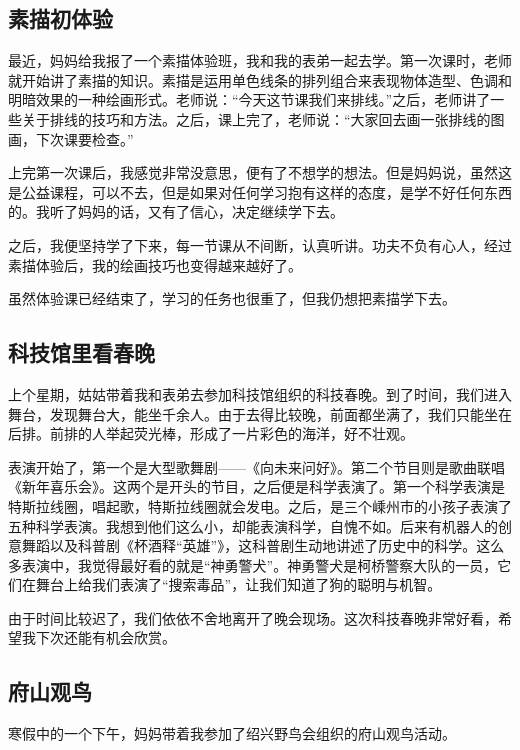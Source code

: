 \documentclass[UTF8,a4paper,titlepage,twoside,10.5pt]{article}
\begin{document}
\subsection{素描初体验}
\label{sec:org617fcf7}

最近，妈妈给我报了一个素描体验班，我和我的表弟一起去学。第一次课时，老师就开始讲了素描的知识。素描是运用单色线条的排列组合来表现物体造型、色调和明暗效果的一种绘画形式。老师说：“今天这节课我们来排线。”之后，老师讲了一些关于排线的技巧和方法。之后，课上完了，老师说：“大家回去画一张排线的图画，下次课要检查。”

上完第一次课后，我感觉非常没意思，便有了不想学的想法。但是妈妈说，虽然这是公益课程，可以不去，但是如果对任何学习抱有这样的态度，是学不好任何东西的。我听了妈妈的话，又有了信心，决定继续学下去。

之后，我便坚持学了下来，每一节课从不间断，认真听讲。功夫不负有心人，经过素描体验后，我的绘画技巧也变得越来越好了。

虽然体验课已经结束了，学习的任务也很重了，但我仍想把素描学下去。

\subsection{科技馆里看春晚}
\label{sec:orgc22557a}

上个星期，姑姑带着我和表弟去参加科技馆组织的科技春晚。到了时间，我们进入舞台，发现舞台大，能坐千余人。由于去得比较晚，前面都坐满了，我们只能坐在后排。前排的人举起荧光棒，形成了一片彩色的海洋，好不壮观。

表演开始了，第一个是大型歌舞剧——《向未来问好》。第二个节目则是歌曲联唱《新年喜乐会》。这两个是开头的节目，之后便是科学表演了。第一个科学表演是特斯拉线圈，唱起歌，特斯拉线圈就会发电。之后，是三个嵊州市的小孩子表演了五种科学表演。我想到他们这么小，却能表演科学，自愧不如。后来有机器人的创意舞蹈以及科普剧《杯酒释“英雄”》，这科普剧生动地讲述了历史中的科学。这么多表演中，我觉得最好看的就是“神勇警犬”。神勇警犬是柯桥警察大队的一员，它们在舞台上给我们表演了“搜索毒品”，让我们知道了狗的聪明与机智。

由于时间比较迟了，我们依依不舍地离开了晚会现场。这次科技春晚非常好看，希望我下次还能有机会欣赏。

\subsection{府山观鸟}
\label{sec:orgc344320}

寒假中的一个下午，妈妈带着我参加了绍兴野鸟会组织的府山观鸟活动。
\end{document}
